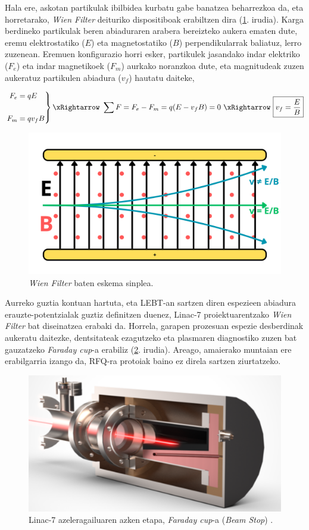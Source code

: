 \documentclass[12pt]{article}
\numberwithin{figure}{section}
\numberwithin{equation}{section}
\begin{document}
Hala ere, askotan partikulak ibilbidea kurbatu gabe banatzea beharrezkoa da, eta horretarako, \textit{Wien Filter} deituriko dispositiboak erabiltzen dira (\ref{fig:wienfilter}. irudia). Karga berdineko partikulak beren abiaduraren arabera bereizteko aukera ematen dute, eremu elektrostatiko ($E$) eta magnetostatiko ($B$) perpendikularrak baliatuz, lerro zuzenean. Eremuen konfigurazio horri esker, partikulek jasandako indar elektriko ($F_e$) eta indar magnetikoek ($F_m$) aurkako noranzkoa dute, eta  magnitudeak zuzen aukeratuz partikulen abiadura ($v_f$) hautatu daiteke,

\begin{equation}
\left.
\begin{aligned}
    F_e &= qE\\\\
    F_m &= qv_fB
\end{aligned}
\right\}
\xRightarrow \
\sum F = F_e - F_m = q (E - v_f  B) = 0\ \xRightarrow \ \boxed{ v_f = \frac{E}{B}}
\label{eq:hautatzaile}
\end{equation}

\begin{figure}[h]
    \centering
    \includegraphics[width=0.5\linewidth]{1 - Sarrera/wienfilter.png}
    \caption{\textit{Wien Filter} baten eskema sinplea.}
    \label{fig:wienfilter}
\end{figure}

Aurreko guztia kontuan hartuta, eta LEBT-an sartzen diren espezieen abiadura erauzte\hyp{}potentzialak guztiz definitzen duenez, Linac-7 proiektuarentzako \textit{Wien Filter} bat diseinatzea erabaki da. Horrela, garapen prozesuan espezie desberdinak aukeratu daitezke, dentsitateak ezagutzeko eta plasmaren diagnostiko zuzen bat gauzatzeko \textit{Faraday cup}-a erabiliz (\ref{fig:faradaycup}. irudia). Areago, amaierako muntaian ere erabilgarria izango da, RFQ-ra protoiak baino ez direla sartzen ziurtatzeko.

\begin{figure}[h]
    \centering
    \includegraphics[width=0.45\linewidth]{1 - Sarrera/faradaycup.png}
    \caption{Linac-7 azeleragailuaren azken etapa, \textit{Faraday cup}-a (\textit{Beam Stop}) \cite{feuchtwanger_new_2022}.}
    \label{fig:faradaycup}
\end{figure}
\end{document}

